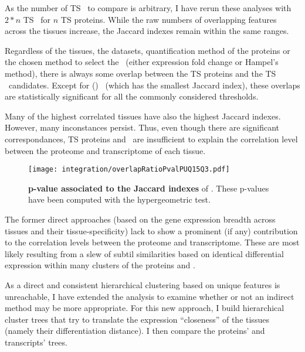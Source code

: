 As the number of \gls{TS} \mRNAs\ to compare is arbitrary,
I have rerun these analyses with $2*n$ \gls{TS} \mRNAs\ for $n$ \gls{TS} proteins.
While the raw numbers of overlapping features across the tissues increase,
the Jaccard indexes remain within the same ranges.

Regardless of the tissues, the datasets, quantification method of the proteins
or the chosen method to select the \mRNAs\
(either expression fold change or Hampel's method),
there is always some overlap between
the \gls{TS} proteins and the \gls{TS} \mRNAs\ candidates.
Except for () \bladder\ (which has the smallest Jaccard index),
these overlaps are statistically significant
for all the commonly considered thresholds.

\vspace{-2mm}
Many of the highest correlated tissues have also the highest Jaccard indexes.
However, many inconstances persist.
Thus, even though there are significant correspondances,
\gls{TS} proteins and \mRNAs\ are insufficient to explain
the correlation level between the proteome and transcriptome of each tissue.
\vspace{-\baselineskip}

\begin{figure}[!htb]
    \texttt{[image: integration/overlapRatioPvalPUQ15Q3.pdf]}\centering
    \vspace{1mm}
    \caption[p-values associated to the Jaccard indexes]{\label{fig:JaccardPvalues}\label{fig:pJacquard}%
    \textbf{p-value associated to the Jaccard indexes} of \Cref{fig:JaccardIndexes}.
    These p-values have been computed with the hypergeometric test.}
    \vspace{-3mm}
\end{figure}

The former direct approaches
(based on the gene expression breadth across tissues and their tissue-specificity)
lack to show a prominent (if any) contribution to the correlation levels
between the proteome and transcriptome.
These are most likely resulting
from a slew of subtil similarities
based on identical differential expression
within many clusters of the proteins and \mRNAs{}.%

As a direct and consistent hierarchical clustering
based on unique features is unreachable,
I have extended the analysis to examine whether or not an indirect method
may be more appropriate.
For this new approach,
I build hierarchical cluster trees that try to translate
the expression \enquote{closeness} of the tissues
(namely their differentiation distance).
I then compare the proteins' and transcripts' trees.\\
\vspace{-\baselineskip}

